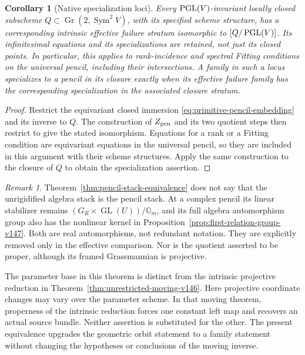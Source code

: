 \documentclass[11pt,reqno]{amsart}
\numberwithin{equation}{section}
\newtheorem{corollary}[theorem]{Corollary}
\theoremstyle{definition}\newtheorem{definition}[theorem]{Definition}
\theoremstyle{remark}\newtheorem{remark}[theorem]{Remark}
\DeclareMathOperator{\Sym}{Sym}\DeclareMathOperator{\Gr}{Gr}
\begin{document}
\begin{corollary}[Native specialization loci]\label{cor:pencil-specialization-stack}
Every \(\operatorname{PGL}(V)\)-invariant locally closed subscheme
\(Q\subset\Gr(2,\Sym^2V)\), with its specified scheme structure,
has a corresponding intrinsic effective failure stratum
isomorphic to \([Q/\operatorname{PGL}(V)]\).  Its infinitesimal equations and its
specializations are retained, not just its closed points.
In particular, this applies to rank-incidence and spectral Fitting
conditions on the universal pencil, including their intersections.
A family in such a locus specializes to a pencil in its closure
exactly when its effective failure family has the corresponding
specialization in the associated closure stratum.
\end{corollary}
\begin{proof}
Restrict the equivariant closed immersion
\eqref{eq:primitive-pencil-embedding} and its inverse to \(Q\).
The construction of \(Z_{\rm pen}\) and its two quotient steps
then restrict to give the stated isomorphism.  Equations for a
rank or a Fitting condition are equivariant equations in the
universal pencil, so they are included in this argument with their
scheme structures.  Apply the same construction to the closure of
\(Q\) to obtain the specialization assertion.
\end{proof}

\begin{remark}\label{rem:moduli-scope}
Theorem~\ref{thm:pencil-stack-equivalence} does not say that the
unrigidified algebra stack is the pencil stack.  At a complex
pencil its linear stabilizer remains
\((G_R\times\operatorname{GL}(U))/\mathbb G_m\), and its full
algebra automorphism group also has the nonlinear kernel in
Proposition~\ref{prop:first-relation-group-v147}.  Both are real
automorphisms, not redundant notation.  They are explicitly removed
only in the effective comparison.  Nor is the quotient asserted to
be proper, although its framed Grassmannian is projective.

The parameter base in this theorem is distinct from the intrinsic
projective reduction in Theorem~\ref{thm:unrestricted-moving-v146}.
Here projective coordinate changes may vary over the parameter
scheme.  In that moving theorem, properness of the intrinsic
reduction forces one constant left map and recovers an actual
source bundle.  Neither assertion is substituted for the other.
The present equivalence upgrades the geometric orbit statement to
a family statement without changing the hypotheses or conclusions
of the moving inverse.
\end{remark}
\end{document}
